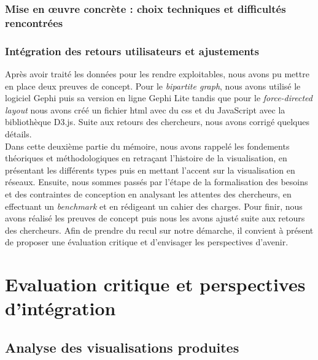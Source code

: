 \documentclass[a4paper,12pt,twoside]{book}
\newcommand{\clearemptydoublepage}{\newpage{\pagestyle{empty}\cleardoublepage}}
\begin{document}
	
	
	\section[Choix techniques et difficultés]{Mise en œuvre concrète : choix techniques et difficultés rencontrées}
	
	
	
	
	\section{Intégration des retours utilisateurs et ajustements}
	
	
	
	Après avoir traité les données pour les rendre exploitables, nous avons pu mettre en place deux preuves de concept. Pour le \textit{bipartite graph}, nous avons utilisé le logiciel Gephi puis sa version en ligne Gephi Lite tandis que pour le \textit{force-directed layout} nous avons créé un fichier \gls{html} avec du \gls{css} et du JavaScript avec la bibliothèque D3.js. Suite aux retours des chercheurs, nous avons corrigé quelques détails.\\
	
	Dans cette deuxième partie du mémoire, nous avons rappelé les fondements théoriques et méthodologiques en retraçant l'histoire de la visualisation, en présentant les différents types puis en mettant l'accent sur la visualisation en réseaux. Ensuite, nous sommes passés par l'étape de la formalisation des besoins et des contraintes de conception en analysant les attentes des chercheurs, en effectuant un \textit{benchmark} et en rédigeant un cahier des charges. Pour finir, nous avons réalisé les preuves de concept puis nous les avons ajusté suite aux retours des chercheurs. Afin de prendre du recul sur notre démarche, il convient à présent de proposer une évaluation critique et d'envisager les perspectives d'avenir.
	
	
	
	\clearemptydoublepage
	
	\part{Evaluation critique et perspectives d'intégration}
	\chapter{Analyse des visualisations produites}
	
\end{document}
